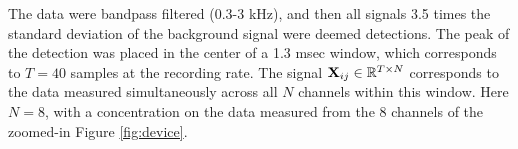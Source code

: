 \documentclass[journal]{IEEEtran}
\begin{document}
The data were bandpass filtered (0.3-3 kHz), and
then all signals 3.5 times the standard deviation of the background
signal were deemed detections. The peak of the detection was placed
in the center of a 1.3 msec window, which corresponds to $T=40$
samples at the recording rate. The signal
${\mathbf X}_{ij}\in\mathbb{R}^{T\times N}$ corresponds to the data
measured simultaneously across all $N$ channels within this window.
Here $N=8$, with a concentration on the data measured from the 8
channels of the zoomed-in Figure \ref{fig:device}.

\end{document}

